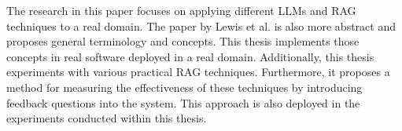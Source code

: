 The research in this paper focuses on applying different \gls{LLM}s and \gls{RAG} techniques to a real domain. The paper by Lewis et al. is also more abstract and proposes general terminology and concepts. This thesis implements those concepts in real software deployed in a real domain. Additionally, this thesis experiments with various practical \gls{RAG} techniques. Furthermore, it proposes a method for measuring the effectiveness of these techniques by introducing feedback questions into the system. This approach is also deployed in the experiments conducted within this thesis.








\cleardoublepage